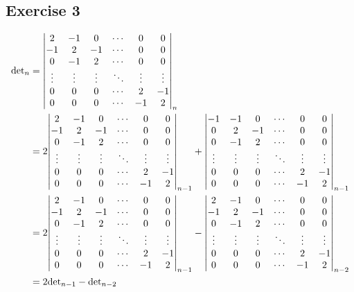 \documentclass[12pt]{article}
\begin{document}
\subsection*{Exercise 3}
\begin{align*}
    {\det}_n &= \mqty|2 & -1 & 0 & \cdots & 0 & 0 \\ -1 & 2 & -1 & \cdots & 0 & 0 \\ 0 & -1 & 2 & \cdots & 0 & 0 \\ \vdots & \vdots & \vdots & \ddots & \vdots & \vdots \\ 0 & 0 & 0 & \cdots & 2 & -1 \\ 0 & 0 & 0 & \cdots & -1 & 2|_n \\
    &= 2\mqty|2 & -1 & 0 & \cdots & 0 & 0 \\ -1 & 2 & -1 & \cdots & 0 & 0 \\ 0 & -1 & 2 & \cdots & 0 & 0 \\ \vdots & \vdots & \vdots & \ddots & \vdots & \vdots \\ 0 & 0 & 0 & \cdots & 2 & -1 \\ 0 & 0 & 0 & \cdots & -1 & 2|_{n-1} + \mqty|-1 & -1 & 0 & \cdots & 0 & 0 \\0 & 2 & -1 & \cdots & 0 & 0 \\0 & -1 & 2 & \cdots & 0 & 0 \\ \vdots & \vdots & \vdots & \ddots & \vdots & \vdots \\0 & 0 & 0 & \cdots & 2 & -1 \\0 & 0 & 0 & \cdots & -1 & 2|_{n-1} \\
    &= 2\mqty|2 & -1 & 0 & \cdots & 0 & 0 \\ -1 & 2 & -1 & \cdots & 0 & 0 \\ 0 & -1 & 2 & \cdots & 0 & 0 \\ \vdots & \vdots & \vdots & \ddots & \vdots & \vdots \\ 0 & 0 & 0 & \cdots & 2 & -1 \\ 0 & 0 & 0 & \cdots & -1 & 2|_{n-1} - \mqty|2 & -1 & 0 & \cdots & 0 & 0 \\ -1 & 2 & -1 & \cdots & 0 & 0 \\ 0 & -1 & 2 & \cdots & 0 & 0 \\ \vdots & \vdots & \vdots & \ddots & \vdots & \vdots \\ 0 & 0 & 0 & \cdots & 2 & -1 \\ 0 & 0 & 0 & \cdots & -1 & 2|_{n-2} \\
    &= 2{\det}_{n-1} - {\det}_{n-2}
\end{align*}
\end{document}

